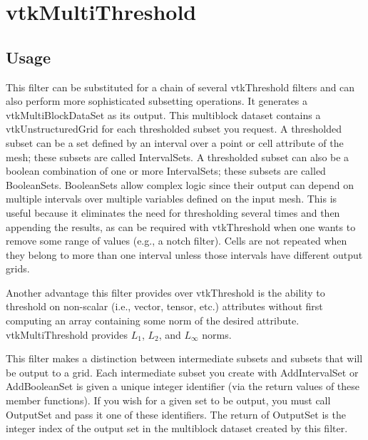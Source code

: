 \section{vtkMultiThreshold}

\subsection{Usage}

 This filter can be substituted for a chain of several vtkThreshold filters
 and can also perform more sophisticated subsetting operations.
 It generates a vtkMultiBlockDataSet as its output.
 This multiblock dataset contains a vtkUnstructuredGrid for each thresholded
 subset you request.
 A thresholded subset can be a set defined by an interval over a
 point or cell attribute of the mesh; these subsets are called IntervalSets.
 A thresholded subset can also be a boolean combination of one or more IntervalSets;
 these subsets are called BooleanSets.
 BooleanSets allow complex logic since their output
 can depend on multiple intervals over multiple variables
 defined on the input mesh.
 This is useful because it eliminates the need for thresholding several
 times and then appending the results, as can be required with vtkThreshold
 when one wants to remove some range of values (e.g., a notch filter).
 Cells are not repeated when they belong to more than one interval unless
 those intervals have different output grids.

 Another advantage this filter provides over vtkThreshold is the ability
 to threshold on non-scalar (i.e., vector, tensor, etc.) attributes without
 first computing an array containing some norm of the desired attribute.
 vtkMultiThreshold provides $L_1$, $L_2$, and $L_{\infty}$ norms.

 This filter makes a distinction between intermediate subsets and
 subsets that will be output to a grid.
 Each intermediate subset you create with AddIntervalSet or
 AddBooleanSet is given a unique integer identifier (via the return
 values of these member functions).
 If you wish for a given set to be output, you must call
 OutputSet and pass it one of these identifiers.
 The return of OutputSet is the integer index of the output set
 in the multiblock dataset created by this filter.

